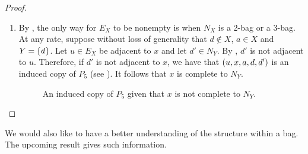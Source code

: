 \begin{proof}
\begin{enumerate}[label=(\roman*)]
        \item By , the only way for $E_X$ to be
            nonempty is when $N_X$ is a 2-bag or a 3-bag. At any rate, suppose
            without loss of generality that $d\notin X$, $a\in X$ and $Y=\left\{d\right\}$.
            Let $u\in E_X$ be adjacent to $x$ and let $d'\in N_Y$. By
            , $d'$ is not adjacent to $u$. Therefore, if $d'$
            is not adjacent to $x$, we have that $\left(u,x,a,d,d'\right)$ is an induced
            copy of $P_5$ (see ). It follows that $x$ is
            complete to $N_Y$.

            \begin{figure}[htb!]
                \centering
                \caption{An induced copy of $P_5$ given that $x$ is not
                    complete to $N_Y$.}
                \label{fig:type_15}
            \end{figure}
    \end{enumerate}

\end{proof}

We would also like to have a better understanding of the structure within a bag.
The upcoming result gives such information.

